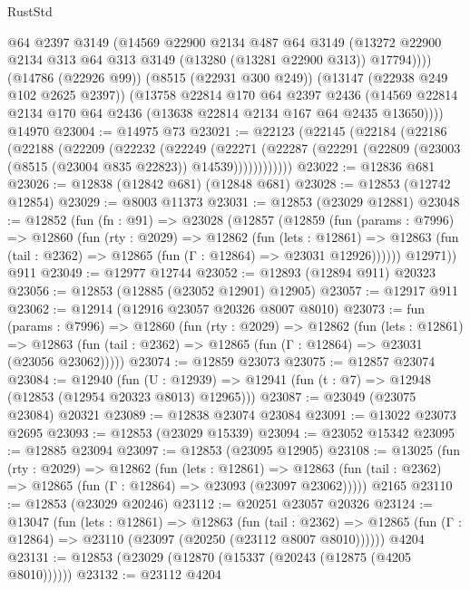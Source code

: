 \begin{lexlean}{RustStd}
\begin{coremodule}
          @64
          @2397
          @3149
          (@14569
            @22900
            @2134
            @487
            @64
            @3149
            (@13272 @22900 @2134 @313 @64 @313 @3149 (@13280 (@13281 @22900 @313)) @17794))))
      (@14786 (@22926 @99))
      (@8515 (@22931 @300 @249))
      (@13147 (@22938 @249 @102 @2625 @2397))
      (@13758
        @22814
        @170
        @64
        @2397
        @2436
        (@14569 @22814 @2134 @170 @64 @2436 (@13638 @22814 @2134 @167 @64 @2435 @13650))))
    @14970
@23004 := @14975 @73
@23021 := @22123
    (@22145
      (@22184
        (@22186
          (@22188
            (@22209
              (@22232
                (@22249
                  (@22271
                    (@22287 (@22291 (@22809 (@23003 (@8515 (@23004 @835 @22823)) @14539))))))))))))
@23022 := @12836 @681
@23026 := @12838 (@12842 @681) (@12848 @681)
@23028 := @12853 (@12742 @12854)
@23029 := @8003 @11373
@23031 := @12853 (@23029 @12881)
@23048 := @12852
    (fun (fn : @91) =>
    @23028
      (@12857
        (@12859
          (fun (params : @7996) =>
          @12860
            (fun (rty : @2029) =>
            @12862
              (fun (lets : @12861) =>
              @12863 (fun (tail : @2362) => @12865 (fun (Γ : @12864) => @23031 @12926))))))
        @12971))
    @911
@23049 := @12977 @12744
@23052 := @12893 (@12894 @911) @20323
@23056 := @12853 (@12885 (@23052 @12901) @12905)
@23057 := @12917 @911
@23062 := @12914 (@12916 @23057 @20326 @8007 @8010)
@23073 := fun (params : @7996) =>
  @12860
    (fun (rty : @2029) =>
    @12862
      (fun (lets : @12861) =>
      @12863 (fun (tail : @2362) => @12865 (fun (Γ : @12864) => @23031 (@23056 @23062)))))
@23074 := @12859 @23073
@23075 := @12857 @23074
@23084 := @12940
    (fun (U : @12939) => @12941 (fun (t : @7) => @12948 (@12853 (@12954 @20323 @8013) @12965)))
@23087 := @23049 (@23075 @23084) @20321
@23089 := @12838 @23074 @23084
@23091 := @13022 @23073 @2695
@23093 := @12853 (@23029 @15339)
@23094 := @23052 @15342
@23095 := @12885 @23094
@23097 := @12853 (@23095 @12905)
@23108 := @13025
    (fun (rty : @2029) =>
    @12862
      (fun (lets : @12861) =>
      @12863 (fun (tail : @2362) => @12865 (fun (Γ : @12864) => @23093 (@23097 @23062)))))
    @2165
@23110 := @12853 (@23029 @20246)
@23112 := @20251 @23057 @20326
@23124 := @13047
    (fun (lets : @12861) =>
    @12863
      (fun (tail : @2362) =>
      @12865 (fun (Γ : @12864) => @23110 (@23097 (@20250 (@23112 @8007 @8010))))))
    @4204
@23131 := @12853 (@23029 (@12870 (@15337 (@20243 (@12875 (@4205 @8010))))))
@23132 := @23112 @4204

\end{coremodule}
\end{lexlean}
